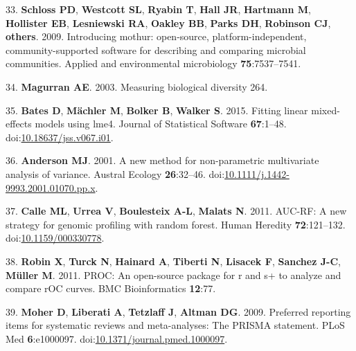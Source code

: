 \documentclass[12pt,]{article}
\begin{document}
\hypertarget{ref-mothur}{}
33. \textbf{Schloss PD}, \textbf{Westcott SL}, \textbf{Ryabin T},
\textbf{Hall JR}, \textbf{Hartmann M}, \textbf{Hollister EB},
\textbf{Lesniewski RA}, \textbf{Oakley BB}, \textbf{Parks DH},
\textbf{Robinson CJ}, \textbf{others}. 2009. Introducing mothur:
open-source, platform-independent, community-supported software for
describing and comparing microbial communities. Applied and
environmental microbiology \textbf{75}:7537--7541.

\hypertarget{ref-Magurran2003}{}
34. \textbf{Magurran AE}. 2003. Measuring biological diversity 264.

\hypertarget{ref-lme4ux5f2015}{}
35. \textbf{Bates D}, \textbf{Mächler M}, \textbf{Bolker B},
\textbf{Walker S}. 2015. Fitting linear mixed-effects models using lme4.
Journal of Statistical Software \textbf{67}:1--48.
doi:\href{https://doi.org/10.18637/jss.v067.i01}{10.18637/jss.v067.i01}.

\hypertarget{ref-Anderson2001}{}
36. \textbf{Anderson MJ}. 2001. A new method for non-parametric
multivariate analysis of variance. Austral Ecology \textbf{26}:32--46.
doi:\href{https://doi.org/10.1111/j.1442-9993.2001.01070.pp.x}{10.1111/j.1442-9993.2001.01070.pp.x}.

\hypertarget{ref-Calle2011}{}
37. \textbf{Calle ML}, \textbf{Urrea V}, \textbf{Boulesteix A-L},
\textbf{Malats N}. 2011. AUC-RF: A new strategy for genomic profiling
with random forest. Human Heredity \textbf{72}:121--132.
doi:\href{https://doi.org/10.1159/000330778}{10.1159/000330778}.

\hypertarget{ref-pROCux5f2011}{}
38. \textbf{Robin X}, \textbf{Turck N}, \textbf{Hainard A},
\textbf{Tiberti N}, \textbf{Lisacek F}, \textbf{Sanchez J-C},
\textbf{Müller M}. 2011. PROC: An open-source package for r and s+ to
analyze and compare rOC curves. BMC Bioinformatics \textbf{12}:77.

\hypertarget{ref-Moher2009}{}
39. \textbf{Moher D}, \textbf{Liberati A}, \textbf{Tetzlaff J},
\textbf{Altman DG}. 2009. Preferred reporting items for systematic
reviews and meta-analyses: The PRISMA statement. PLoS Med
\textbf{6}:e1000097.
doi:\href{https://doi.org/10.1371/journal.pmed.1000097}{10.1371/journal.pmed.1000097}.
\end{document}
